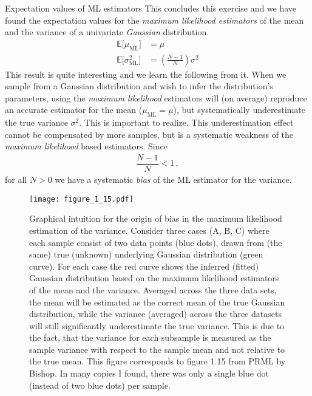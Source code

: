 \documentclass[11pt, DINA4, fleqn]{amsart}
\begin{document}
\begin{mybox_tc3}{Expectation values of ML estimators}
This concludes this exercise and we have found the expectation values for the \emph{maximum likelihood estimators} of the mean and the variance of a univariate \emph{Gaussian} distribution.
\begin{align}
\mathbb{E}\bigl[\mu_{\text{ML}}\bigl] &= \mu \\
\mathbb{E}\bigl[\sigma^2_{\text{ML}}\bigl] &= \left(\frac{N - 1}{N}\right) \sigma^2
\end{align}
This result is quite interesting and we learn the following from it. When we sample from a Gaussian distribution and wish to infer the distribution's parameters, using the \emph{maximum likelihood} estimators will (on average) reproduce an accurate estimator for the mean ($\mu_{\text{ML}}= \mu$), but systematically underestimate the true variance $\sigma^2$. This is important to realize. This underestimation effect cannot be compensated by more samples, but is a systematic weakness of the \emph{maximum likelihood} based estimators.
Since
\begin{align}
\dfrac{N-1}{N} < 1 \, ,
\end{align}
for all $N > 0$ we have a systematic \emph{bias} of the ML estimator for the variance.
\end{mybox_tc3}

\begin{figure}[h]
	\centering
	\texttt{[image: figure\_1\_15.pdf]}
	\caption{Graphical intuition for the origin of bias in the maximum likelihood estimation of the variance. Consider three cases (A, B, C) where each sample consist of two data points (blue dots), drawn from (the same) true (unknown) underlying Gaussian distribution (green curve). For each case the red curve shows the inferred (fitted) Gaussian distribution based on the maximum likelihood estimators of the mean and the variance. Averaged across the three data sets, the mean will be estimated as the correct mean of the true Gaussian distribution, while the variance (averaged) across the three datasets will still significantly underestimate the true variance. This is due to the fact, that the variance for each subsample is measured as the sample variance with respect to the sample mean and not relative to the true mean. This figure corresponds to figure 1.15 from PRML by Bishop. In many copies I found, there was only a single blue dot (instead of two blue dots) per sample.
	\label{fig:figure_1.15}}
\end{figure}
\end{document}
